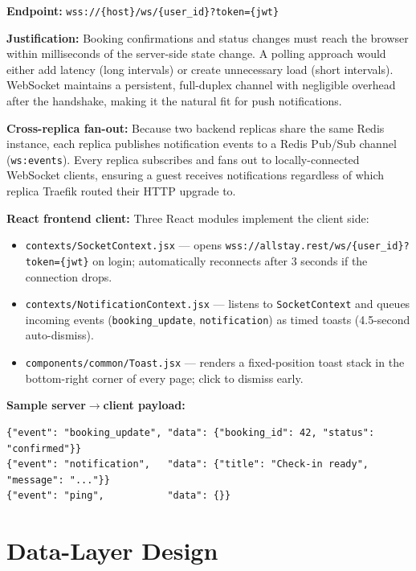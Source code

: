 \documentclass[12pt,a4paper]{article}
\begin{document}
\textbf{Endpoint:} \texttt{wss://\{host\}/ws/\{user\_id\}?token=\{jwt\}}

\textbf{Justification:} Booking confirmations and status changes must reach the browser within milliseconds of the server-side state change. A polling approach would either add latency (long intervals) or create unnecessary load (short intervals). WebSocket maintains a persistent, full-duplex channel with negligible overhead after the handshake, making it the natural fit for push notifications.

\textbf{Cross-replica fan-out:} Because two backend replicas share the same Redis instance, each replica publishes notification events to a Redis Pub/Sub channel (\texttt{ws:events}). Every replica subscribes and fans out to locally-connected WebSocket clients, ensuring a guest receives notifications regardless of which replica Traefik routed their HTTP upgrade to.

\textbf{React frontend client:} Three React modules implement the client side:
\begin{itemize}[noitemsep]
  \item \texttt{contexts/SocketContext.jsx} --- opens \texttt{wss://allstay.rest/ws/\{user\_id\}?token=\{jwt\}} on login; automatically reconnects after 3 seconds if the connection drops.
  \item \texttt{contexts/NotificationContext.jsx} --- listens to \texttt{SocketContext} and queues incoming events (\texttt{booking\_update}, \texttt{notification}) as timed toasts (4.5-second auto-dismiss).
  \item \texttt{components/common/Toast.jsx} --- renders a fixed-position toast stack in the bottom-right corner of every page; click to dismiss early.
\end{itemize}

\textbf{Sample server$\to$client payload:}
\begin{lstlisting}[language={}]
{"event": "booking_update", "data": {"booking_id": 42, "status": "confirmed"}}
{"event": "notification",   "data": {"title": "Check-in ready", "message": "..."}}
{"event": "ping",           "data": {}}
\end{lstlisting}

\section{Data-Layer Design}
\end{document}
